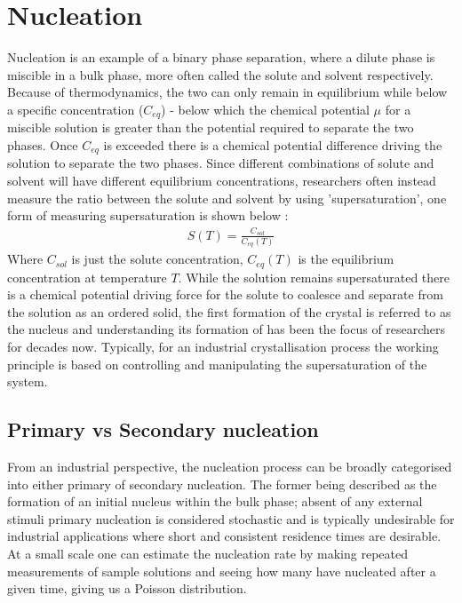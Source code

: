 \section{Nucleation}
Nucleation is an example of a binary phase separation, 
where a dilute phase is miscible in a bulk phase, more 
often called the solute and solvent respectively. Because 
of thermodynamics, the two can only remain in equilibrium while 
below a specific concentration ($C_{eq}$) - below which 
the chemical potential $\mu$ for a miscible solution 
is greater than the potential required to separate 
the two phases. Once $C_{eq}$ is exceeded there is a chemical
 potential difference driving the solution to separate the 
two phases. Since different combinations of solute and solvent
will have different equilibrium concentrations, researchers often 
instead measure the ratio between the solute and solvent by using 
'supersaturation', one form of measuring supersaturation is shown 
below \cite{Mullin2001}:
\begin{align}
	\label{eq:supersaturation}
	S(T) = \frac{C_{sol}}{C_{eq}(T)}
\end{align}
Where $C_{sol}$ is just the solute concentration, $C_{eq}(T)$
is the equilibrium concentration at temperature $T$.
While the solution remains supersaturated there is a 
chemical potential driving force for the solute 
to coalesce and separate from the solution as an ordered solid, 
the first formation of the crystal is referred to as the 
nucleus and understanding its formation of has been the 
focus of researchers for decades now. Typically, for an 
industrial crystallisation process the working principle 
is based on controlling and manipulating the supersaturation
of the system. 

\subsection{Primary vs Secondary nucleation}
From an industrial perspective, the nucleation process can
be broadly categorised into either primary of secondary 
nucleation. The former being described as the formation of an
initial nucleus within the bulk phase; absent of any external
stimuli primary nucleation is considered stochastic and is typically
undesirable for industrial applications where short and consistent 
residence times are desirable. At a small scale one can estimate the 
nucleation rate by making repeated measurements of sample solutions 
and seeing how many have nucleated after a given time, giving us a 
Poisson distribution.

